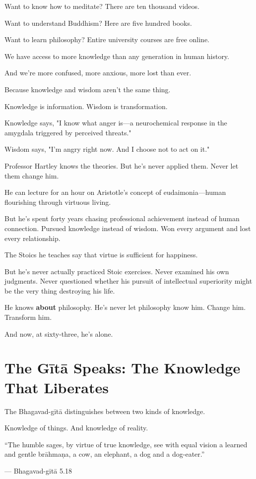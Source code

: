 \documentclass[11pt,twoside]{book}
\begin{document}
Want to know how to meditate? There are ten thousand videos.

Want to understand Buddhism? Here are five hundred books.

Want to learn philosophy? Entire university courses are free online.

We have access to more knowledge than any generation in human history.

And we're more confused, more anxious, more lost than ever.

Because knowledge and wisdom aren't the same thing.

Knowledge is information. Wisdom is transformation.

Knowledge says, "I know what anger is—a neurochemical response in the amygdala triggered by perceived threats."

Wisdom says, "I'm angry right now. And I choose not to act on it."

Professor Hartley knows the theories. But he's never applied them. Never let them change him.

He can lecture for an hour on Aristotle's concept of eudaimonia—human flourishing through virtuous living.

But he's spent forty years chasing professional achievement instead of human connection. Pursued knowledge instead of wisdom. Won every argument and lost every relationship.

The Stoics he teaches say that virtue is sufficient for happiness.

But he's never actually practiced Stoic exercises. Never examined his own judgments. Never questioned whether his pursuit of intellectual superiority might be the very thing destroying his life.

He knows \textbf{about} philosophy. He's never let philosophy know him. Change him. Transform him.

And now, at sixty-three, he's alone.

\section*{The Gītā Speaks: The Knowledge That Liberates}

The Bhagavad-gītā distinguishes between two kinds of knowledge.

Knowledge of things. And knowledge of reality.

\begin{pullquote}
``The humble sages, by virtue of true knowledge, see with equal vision a learned and gentle brāhmaṇa, a cow, an elephant, a dog and a dog-eater.''

--- Bhagavad-gītā 5.18
\end{pullquote}
\end{document}

